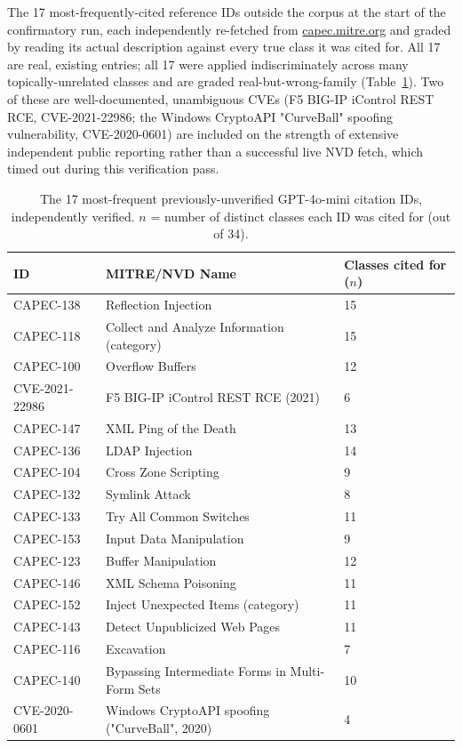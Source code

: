 \documentclass[twocolumn]{svjour3}
\begin{document}
The 17 most-frequently-cited reference IDs outside the corpus at the start of the confirmatory
run, each independently re-fetched from \url{capec.mitre.org} and graded by reading its actual
description against every true class it was cited for. All 17 are real, existing entries; all 17
were applied indiscriminately across many topically-unrelated classes and are graded
real-but-wrong-family (Table~\ref{tab:newids}). Two of these are well-documented, unambiguous CVEs
(F5 BIG-IP iControl REST RCE, CVE-2021-22986; the Windows CryptoAPI "CurveBall" spoofing
vulnerability, CVE-2020-0601) are included on the strength of extensive independent public
reporting rather than a successful live NVD fetch, which timed out during this verification pass.

\begin{table}[t]
\centering
\caption{The 17 most-frequent previously-unverified GPT-4o-mini citation IDs, independently
verified. $n$ = number of distinct classes each ID was cited for (out of 34).}
\label{tab:newids}
\begin{tabular}{lll}
\toprule
ID & MITRE\slash NVD Name & Classes cited for ($n$) \\
\midrule
CAPEC-138 & Reflection Injection & 15 \\
CAPEC-118 & Collect and Analyze Information (category) & 15 \\
CAPEC-100 & Overflow Buffers & 12 \\
CVE-2021-22986 & F5 BIG-IP iControl REST RCE (2021) & 6 \\
CAPEC-147 & XML Ping of the Death & 13 \\
CAPEC-136 & LDAP Injection & 14 \\
CAPEC-104 & Cross Zone Scripting & 9 \\
CAPEC-132 & Symlink Attack & 8 \\
CAPEC-133 & Try All Common Switches & 11 \\
CAPEC-153 & Input Data Manipulation & 9 \\
CAPEC-123 & Buffer Manipulation & 12 \\
CAPEC-146 & XML Schema Poisoning & 11 \\
CAPEC-152 & Inject Unexpected Items (category) & 11 \\
CAPEC-143 & Detect Unpublicized Web Pages & 11 \\
CAPEC-116 & Excavation & 7 \\
CAPEC-140 & Bypassing Intermediate Forms in Multi-Form Sets & 10 \\
CVE-2020-0601 & Windows CryptoAPI spoofing ("CurveBall", 2020) & 4 \\
\bottomrule
\end{tabular}
\end{table}
\end{document}
